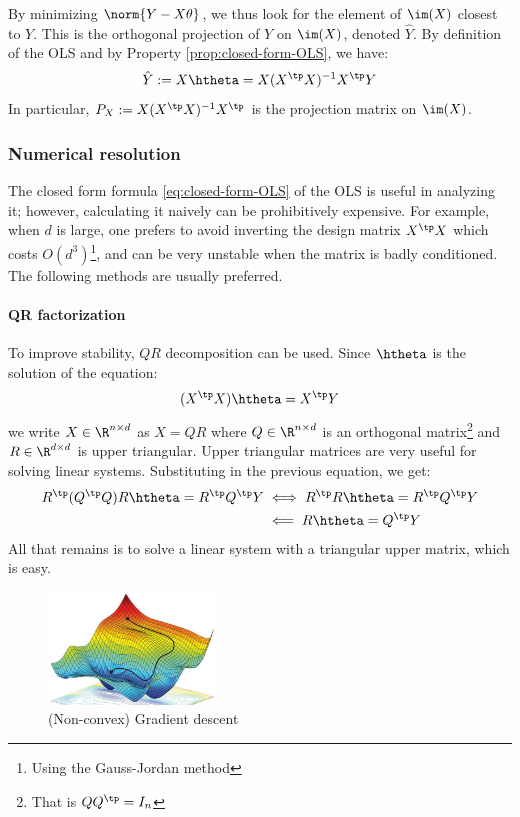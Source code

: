 \documentclass[toc, titlepaged]{../cs-classes/cs-classes}
\begin{document}
By minimizing $\norm{Y-X\theta}$, we thus look for the element of $\im(X)$ closest to $Y$. This is the orthogonal projection of $Y$ on $\im(X)$, denoted $\hat{Y}$. By definition of the OLS and by Property \ref{prop:closed-form-OLS}, we have:
\begin{equation*}
    \hat{Y} := X\htheta = X(X^\tp X)^{-1}X^\tp Y
\end{equation*}
In particular, $P_X:=X(X^\tp X)^{-1}X^\tp$ is the projection matrix on $\im(X)$.

\subsubsection{Numerical resolution}
The closed form formula \eqref{eq:closed-form-OLS} of the OLS is useful in analyzing it; however, calculating it naively can be prohibitively expensive. For example, when $d$ is large, one prefers to avoid inverting the design matrix $X^\tp X$ which costs $O(d^3)$\footnote{Using the Gauss-Jordan method}, and can be very unstable when the matrix is badly conditioned. The following methods are usually preferred.

\paragraph*{QR factorization}
To improve stability, $QR$ decomposition can be used. Since $\htheta$ is the solution of the equation:
\begin{equation*}
    (X^\tp X)\htheta = X^\tp Y
\end{equation*}
we write $X\in\R^{n\times d}$ as $X=QR$ where $Q\in\R^{n\times d}$ is an orthogonal matrix\footnote{That is $QQ^\tp=I_n$} and $R\in\R^{d\times d}$ is upper triangular. Upper triangular matrices are very useful for solving linear systems. Substituting in the previous equation, we get:
\begin{equation*}
    \begin{aligned}
        R^\tp(Q^\tp Q)R\htheta = R^\tp Q^\tp Y &\iff R^\tp R\htheta = R^\tp Q^\tp Y \\
        &\impliedby R\htheta = Q^\tp Y
    \end{aligned}
\end{equation*}
All that remains is to solve a linear system with a triangular upper matrix, which is easy.

\begin{figure}
    \centering
    \includegraphics[width=0.4\textwidth]{images/gradient-descent.jpg}
    \caption{(Non-convex) Gradient descent}
\end{figure}
\end{document}
